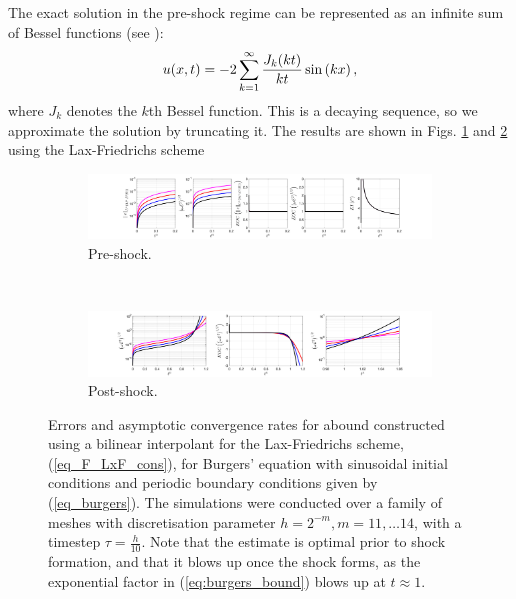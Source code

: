 \documentclass[final]{amsart}
\numberwithin{equation}{section}
\begin{document}
The exact solution in the pre-shock regime can be represented as an
infinite sum of Bessel functions (see
\cite{giesselmann2015posteriori}):
\begin{equation}
u\!\left({x,t}\right)=-2\sum_{k=1}^{\infty}\frac{J_k\!\left({kt}\right)}{kt}\operatorname{sin}\left(kx\right),
\end{equation}
where $J_k$ denotes the $k$th Bessel function.  This is a decaying
sequence, so we approximate the solution by truncating it.  The
results are shown in Figs. \ref{fig:Burgers_LxF_preshock} and
\ref{fig:Burgers_LxF_postshock} using the Lax-Friedrichs scheme
\begin{figure}[H]
	\begin{subfigure}[b]{\textwidth}
		\includegraphics[width=\textwidth]{../figures/fig_LxF_preshockplots_1x5_sin_IC_P3_burgers}	
		\caption{
			\label{fig:Burgers_LxF_preshock}
		Pre-shock.
		}
	\end{subfigure}
	\\
	\begin{subfigure}[b]{\textwidth}
		\includegraphics[width=\textwidth]{../figures/fig_LxF_postshockplots_1x5_sin_IC_P3_burgers}	
		\caption{\label{fig:Burgers_LxF_postshock}
		Post-shock.
		}
	\end{subfigure}
	\caption{\label{fig:LxF} Errors and asymptotic
		convergence rates for abound constructed using a bilinear interpolant for the Lax-Friedrichs scheme,
		(\ref{eq_F_LxF_cons}), for Burgers' equation with sinusoidal initial conditions and periodic boundary conditions given by (\ref{eq_burgers}).  The simulations were
		conducted over a family of meshes with discretisation parameter $h
		= 2^{-m}, m = 11,\dots 14$, with a timestep $\tau =
		\tfrac{h}{10}$. Note that the estimate is optimal prior to shock formation, and that it blows up once the shock forms,  as the exponential factor in (\ref{eq:burgers_bound}) blows up at $t\approx1$. }
\end{figure}
\end{document}
